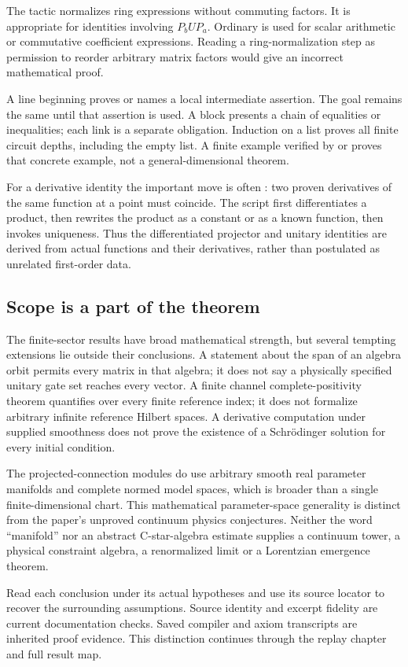 The tactic  normalizes ring expressions without commuting factors. It is appropriate for identities involving $P_bUP_a$. Ordinary  is used for scalar arithmetic or commutative coefficient expressions. Reading a ring-normalization step as permission to reorder arbitrary matrix factors would give an incorrect mathematical proof.

A line beginning  proves or names a local intermediate assertion. The goal remains the same until that assertion is used. A  block presents a chain of equalities or inequalities; each link is a separate obligation. Induction on a list proves all finite circuit depths, including the empty list. A finite example verified by  or  proves that concrete example, not a general-dimensional theorem.

For a derivative identity the important move is often : two proven derivatives of the same function at a point must coincide. The script first differentiates a product, then rewrites the product as a constant or as a known function, then invokes uniqueness. Thus the differentiated projector and unitary identities are derived from actual functions and their derivatives, rather than postulated as unrelated first-order data.

\subsection{Scope is a part of the theorem}
The finite-sector results have broad mathematical strength, but several tempting extensions lie outside their conclusions. A statement about the span of an algebra orbit permits every matrix in that algebra; it does not say a physically specified unitary gate set reaches every vector. A finite channel complete-positivity theorem quantifies over every finite reference index; it does not formalize arbitrary infinite reference Hilbert spaces. A derivative computation under supplied smoothness does not prove the existence of a Schrödinger solution for every initial condition.

The projected-connection modules do use arbitrary smooth real parameter manifolds and complete normed model spaces, which is broader than a single finite-dimensional chart. This mathematical parameter-space generality is distinct from the paper's unproved continuum physics conjectures. Neither the word ``manifold'' nor an abstract C-star-algebra estimate supplies a continuum tower, a physical constraint algebra, a renormalized limit or a Lorentzian emergence theorem.

Read each conclusion under its actual hypotheses and use its source locator to recover the surrounding assumptions. Source identity and excerpt fidelity are current documentation checks. Saved compiler and axiom transcripts are inherited proof evidence. This distinction continues through the replay chapter and full result map.
